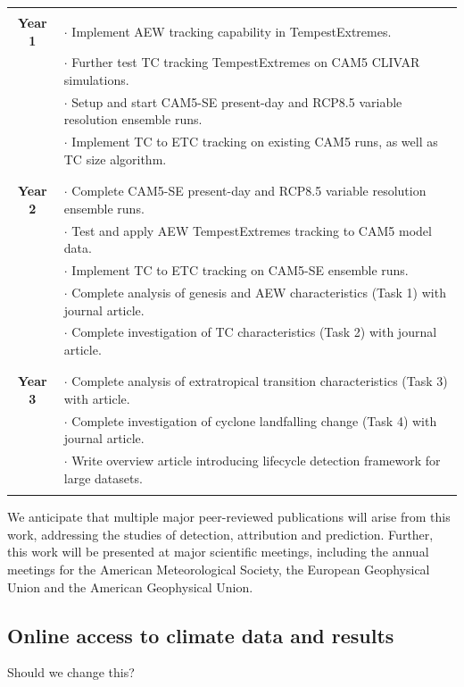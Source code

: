 \documentclass[11pt]{article}
\begin{document}
\begin{tabularx}{\textwidth}{cX}
\hline
\\
\textbf{Year 1} & $\cdot$ Implement AEW tracking capability in TempestExtremes. \\
& $\cdot$ Further test TC tracking TempestExtremes on CAM5 CLIVAR simulations. \\
& $\cdot$ Setup and start CAM5-SE present-day and RCP8.5 variable resolution ensemble runs. \\
& $\cdot$ Implement TC to ETC tracking on existing CAM5 runs, as well as TC size algorithm.\\ 
\\
\hline
\\
\textbf{Year 2} & $\cdot$ Complete CAM5-SE present-day and RCP8.5 variable resolution ensemble runs.  \\
& $\cdot$ Test and apply AEW TempestExtremes tracking to CAM5 model data. \\
& $\cdot$ Implement TC to ETC tracking on CAM5-SE ensemble runs.\\
& $\cdot$ Complete analysis of genesis and AEW characteristics (Task 1) with journal article. \\
& $\cdot$ Complete investigation of TC characteristics (Task 2) with journal article. \\
\\
\hline
\\
\textbf{Year 3} & $\cdot$ Complete analysis of extratropical transition characteristics (Task 3) with article. \\ 
& $\cdot$ Complete investigation of cyclone landfalling change (Task 4) with journal article. \\
& $\cdot$ Write overview article introducing lifecycle detection framework for large datasets. \\
\\
\hline
\end{tabularx}

We anticipate that multiple major peer-reviewed publications will arise from this work, addressing the studies of detection, attribution and prediction. Further, this work will be presented at major scientific meetings, including the annual meetings for the American Meteorological Society, the European Geophysical Union and the American Geophysical Union.

\subsection{Online access to climate data and results}\label{sec:data access}
{\color{red}Should we change this?}
\end{document}
